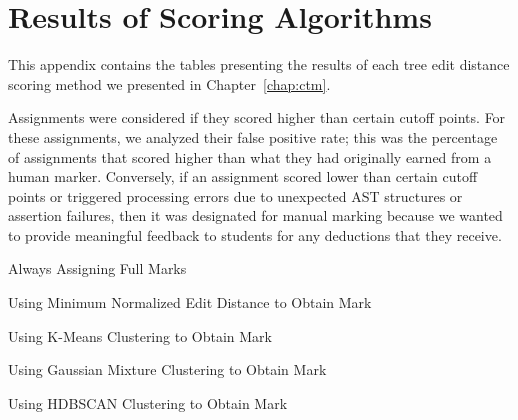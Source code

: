 \chapter{Results of Scoring Algorithms}

This appendix contains the tables presenting the results of each tree edit distance scoring method we presented in Chapter~\ref{chap:ctm}.

Assignments were considered  if they scored higher than certain cutoff points. For these assignments, we analyzed their false positive rate; this was the percentage of assignments that scored higher than what they had originally earned from a human marker. Conversely, if an assignment scored lower than certain cutoff points or triggered processing errors due to unexpected AST structures or assertion failures, then it was designated for manual marking because we wanted to provide meaningful feedback to students for any deductions that they receive. 

\begin{table}
\caption{Always Assigning Full Marks}
\label{tab:ctm-full-marks}

\end{table}

\begin{table}
\caption{Using Minimum Normalized Edit Distance to Obtain Mark}
\label{tab:ctm-min-dist}

\end{table}

\begin{table}
\caption{Using K-Means Clustering to Obtain Mark}
\label{tab:ctm-km}

\end{table}

\begin{table}
\caption{Using Gaussian Mixture Clustering to Obtain Mark}
\label{tab:ctm-gm}

\end{table}

\begin{table}
\caption{Using HDBSCAN Clustering to Obtain Mark}
\label{tab:ctm-hdb}

\end{table}
